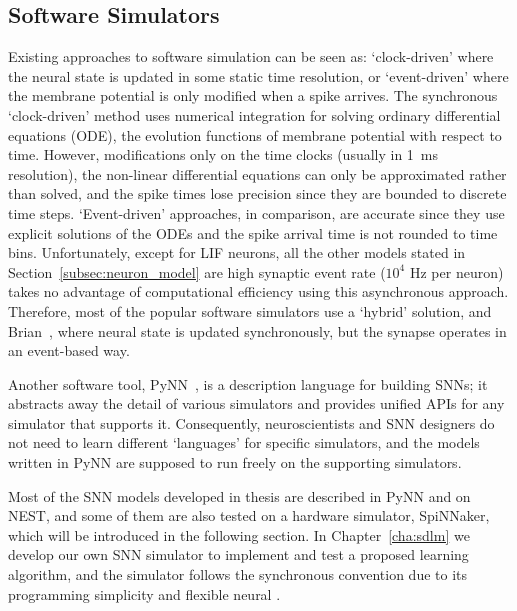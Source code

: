 \subsection{Software Simulators}
Existing approaches to software simulation can be seen as: `clock-driven' where the neural state is updated in some static time resolution, or `event-driven' where the membrane potential is only modified when a spike arrives.
The synchronous `clock-driven' method uses numerical integration for solving ordinary differential equations (ODE), the evolution functions of membrane potential with respect to time.
However, modifications only on the time clocks (usually in 1~ms resolution), the non-linear differential equations can only be approximated rather than solved, and the spike times lose precision since they are bounded to discrete time steps.
`Event-driven' approaches, in comparison, are accurate since they use explicit solutions of the ODEs and the spike arrival time is not rounded to time bins.
Unfortunately, except for LIF neurons, all the other models stated in Section~\ref{subsec:neuron_model} are \DIFdelbegin {}\DIFdelend \DIFaddbegin {}\DIFaddend high synaptic event rate ($10^4$ Hz per neuron) takes no advantage of computational efficiency using this asynchronous approach.
Therefore, most of the popular software simulators use a `hybrid' solution, \DIFdelbegin {}\DIFdelend \DIFaddbegin {}\DIFaddend and Brian~\DIFdelbegin {}\DIFdelend \DIFaddbegin {}\DIFaddend , where 
neural state is updated synchronously, but the synapse operates in an event-based way.

Another software tool, PyNN~\DIFdelbegin {}\DIFdelend \DIFaddbegin {}\DIFaddend , is a description language for building SNNs;
it abstracts away the detail of various simulators and provides unified APIs for any simulator that supports it.
Consequently, neuroscientists and SNN designers do not need to learn different `languages' for specific simulators, and the models written in PyNN are supposed to run freely on the supporting simulators.

Most of the SNN models developed in \DIFdelbegin {}\DIFdelend \DIFaddbegin {}\DIFaddend thesis are described in PyNN and \DIFdelbegin {}\DIFdelend \DIFaddbegin {}\DIFaddend on NEST, and some of them are also tested on a hardware simulator, SpiNNaker, which will be introduced in the following section.
In Chapter~\ref{cha:sdlm} we develop our own SNN simulator to implement and test a proposed learning algorithm, and the simulator follows the synchronous convention due to its programming simplicity and flexible neural \DIFdelbegin {}\DIFdelend \DIFaddbegin {}\DIFaddend . 

